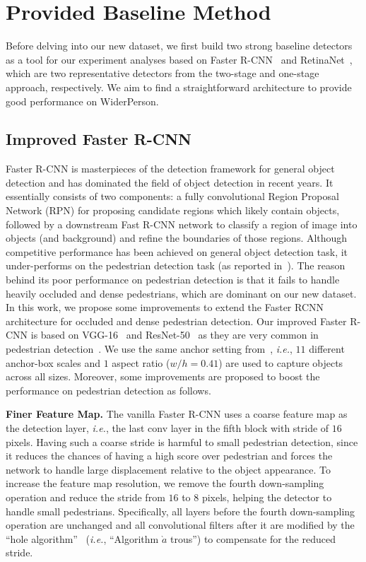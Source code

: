 \documentclass[journal]{IEEEtran}
\def\ie{{\em i.e.}}
\begin{document}
\section{Provided Baseline Method}\label{4}
Before delving into our new dataset, we first build two strong baseline detectors as a tool for our experiment analyses based on Faster R-CNN~\cite{DBLP:journals/pami/RenHG017} and RetinaNet~\cite{DBLP:conf/iccv/LinPRK17}, which are two representative detectors from the two-stage and one-stage approach, respectively. We aim to find a straightforward architecture to provide good performance on WiderPerson.

\subsection{Improved Faster R-CNN}
Faster R-CNN is masterpieces of the detection framework for general object detection and has dominated the field of object detection in recent years. It essentially consists of two components: a fully convolutional Region Proposal Network (RPN) for proposing candidate regions which likely contain objects, followed by a downstream Fast R-CNN network to classify a region of image into objects (and background) and refine the boundaries of those regions. Although competitive performance has been achieved on general object detection task, it under-performs on the pedestrian detection task (as reported in~\cite{DBLP:conf/eccv/ZhangLLH16}). The reason behind its poor performance on pedestrian detection is that it fails to handle heavily occluded and dense pedestrians, which are dominant on our new dataset. In this work, we propose some improvements to extend the Faster RCNN architecture for occluded and dense pedestrian detection. Our improved Faster R-CNN is based on VGG-16~\cite{DBLP:journals/corr/SimonyanZ14a} and ResNet-50~\cite{DBLP:conf/cvpr/HeZRS16} as they are very common in pedestrian detection~\cite{DBLP:conf/eccv/ZhangLLH16, DBLP:conf/cvpr/ZhangBS17, DBLP:conf/cvpr/MaoXJC17}. We use the same anchor setting from~\cite{DBLP:conf/cvpr/ZhangBS17}, \ie, $11$ different anchor-box scales and $1$ aspect ratio ($w/h=0.41$) are used to capture objects across all sizes. Moreover, some improvements are proposed to boost the performance on pedestrian detection as follows. 

{\flushleft \textbf{Finer Feature Map.}}
The vanilla Faster R-CNN uses a coarse feature map as the detection layer, \ie, the last conv layer in the fifth block with stride of $16$ pixels. Having such a coarse stride is harmful to small pedestrian detection, since it reduces the chances of having a high score over pedestrian and forces the network to handle large displacement relative to the object appearance. To increase the feature map resolution, we remove the fourth down-sampling operation and reduce the stride from $16$ to $8$ pixels, helping the detector to handle small pedestrians. Specifically, all layers before the fourth down-sampling operation are unchanged and all convolutional filters after it are modified by the ``hole algorithm''~\cite{DBLP:conf/cvpr/LongSD15} (\ie, ``Algorithm $\grave{a}$ trous'') to compensate for the reduced stride.
\end{document}
